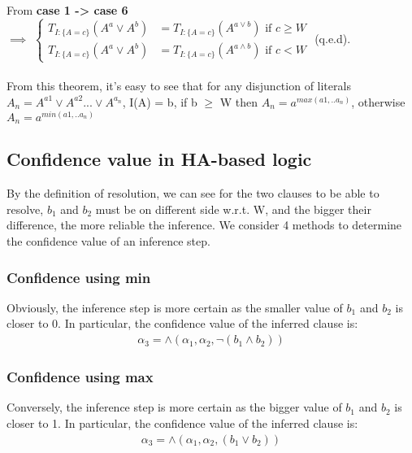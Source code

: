 \documentclass[part1.tex]{subfiles}
\begin{document}
\paragraph{} From {\bfseries case 1 -> case 6}\\
$\implies$ \(
   \begin{cases}
           T_{I:\{A = c\}}(A^{a} \vee A^{b}) &=  T_{I:\{A =
           c\}}(A^{a \vee b})  \text{ if } c \ge W \\

           T_{I:\{A = c\}}(A^{a} \vee A^{b}) &=  T_{I:\{A =
           c\}}(A^{a \wedge b}) \text{ if } c < W
   \end{cases} 
   \) (q.e.d).
\paragraph{} From this theorem, it's easy to see that for any
disjunction of literals $A_{n} = A^{a1} \vee A^{a2} ... \vee A^{a_{n}}$,
I(A) = b, if b $\ge$ W then $A_{n} = a^{max(a1,..a_{n})}$, otherwise
$A_{n} = a^{min(a1,..a_{n})}$
\subsection{Confidence value in HA-based logic}
By the definition of resolution, we can see for the two clauses to be able to resolve, \(b_1\) and 
\(b_2\) must be on different side w.r.t. W, and the bigger their difference, the more reliable the 
inference. We consider 4 methods to determine the confidence value of an inference step.\\
\subsubsection{Confidence using min}
Obviously, the inference step is more certain as the smaller value of \(b_1\) and \(b_2\) is closer to 
0. In particular, the confidence value of the inferred clause is:
\begin{align*}
	{\alpha}_3 = \wedge({\alpha}_1, {\alpha}_2, \neg(b_1 \wedge b_2))
\end{align*}
\subsubsection{Confidence using max}
Conversely, the inference step is more certain as the bigger value of \(b_1\) and \(b_2\) is closer to 
1. In particular, the confidence value of the inferred clause is:
\begin{align*}
	{\alpha}_3 = \wedge({\alpha}_1, {\alpha}_2, (b_1 \vee b_2))
\end{align*}
\end{document}
